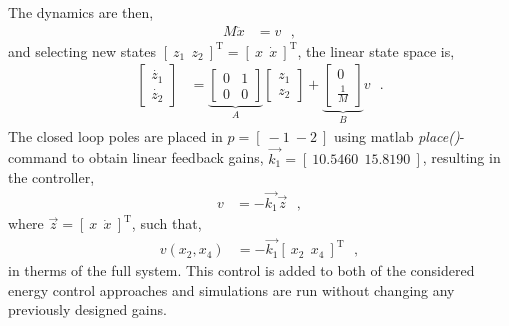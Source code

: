 %
The dynamics are then,
\begin{align}
  M \ddot{x} &=  v \ \ \ ,  \label{eq:simpleDynamics} 
\end{align}
and selecting new states $ [\ z_1\ \ z_2\ ]^\mathrm{T} = [\ x\ \ \dot{x}\ ]^\mathrm{T} $, the linear state space is,\vspace{6pt}
\begin{align}
  \begin{bmatrix}
    \dot{z_1} \\
    \dot{z_2}
  \end{bmatrix}
  &=
  \underbrace{
    \begin{bmatrix}
      0 & 1 \\
      0 & 0
    \end{bmatrix}
  }_{A}
  \begin{bmatrix}
    z_1 \\
    z_2
  \end{bmatrix}
  +
  \underbrace{
    \begin{bmatrix}
      0 \\
      \tfrac{1}{M}
    \end{bmatrix}
  }_{B}
  v
  \label{eq:simpleLinearStateSpace} \ \ \ .
\end{align}
%
The closed loop poles are placed in $p = [\ -1\ -2 \ ] $ using matlab \textit{place()}-command to obtain linear feedback gains, $\vec{k_1} = [\ 10.5460\ \ 15.8190\ ]$, resulting in the controller,
\begin{align}
  v &= -\vec{k_1} \vec{z} \ \ \ ,  \label{eq:linearFeedbackSimple} 
\end{align}
where $\vec{z} = [\ x\ \ \dot{x}\ ]^\mathrm{T}$, such that,
\begin{align}
  v(x_2,x_4) &= -\vec{k_1}  [\ x_2\ \ x_4\ ]^\mathrm{T} \ \ \ ,    \label{eq:linearFeedbackSimple2} 
\end{align}
in therms of the full system. This control is added to both of the considered energy control approaches and simulations are run without changing any previously designed gains.

